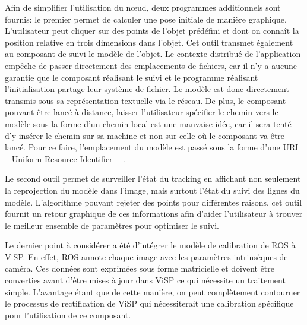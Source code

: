 Afin de simplifier l'utilisation du n\oe ud, deux programmes
additionnels sont fournis: le premier permet de calculer une pose
initiale de manière graphique. L'utilisateur peut cliquer sur des
points de l'objet prédéfini et dont on connaît la position relative en
trois dimensions dans l'objet. Cet outil transmet également au
composant de suivi le modèle de l'objet. Le contexte distribué de
l'application empêche de passer directement des emplacements de
fichiers, car il n'y a aucune garantie que le composant réalisant le
suivi et le programme réalisant l'initialisation partage leur système
de fichier. Le modèle est donc directement transmis sous sa
représentation textuelle via le réseau. De plus, le composant pouvant
être lancé à distance, laisser l'utilisateur spécifier le chemin vers
le modèle sous la forme d'un chemin local est une mauvaise idée, car
il sera tenté d'y insérer le chemin sur sa machine et non sur celle où
le composant va être lancé. Pour ce faire, l'emplacement du modèle est
passé sous la forme d'une URI -- Uniform Resource Identifier
-- \citep{rfc2396}.


Le second outil permet de surveiller l'état du tracking en affichant
non seulement la reprojection du modèle dans l'image, mais surtout
l'état du suivi des lignes du modèle. L'algorithme pouvant rejeter des
points pour différentes raisons, cet outil fournit un retour graphique
de ces informations afin d'aider l'utilisateur à trouver le meilleur
ensemble de paramètres pour optimiser le suivi.


Le dernier point à considérer a été d'intégrer le modèle de
calibration de ROS à ViSP. En effet, ROS annote chaque
image avec les paramètres intrinsèques de caméra. Ces données sont exprimées sous forme
matricielle et doivent être converties avant d'être mises à jour dans
ViSP ce qui nécessite un traitement simple. L'avantage étant que de
cette manière, on peut complètement contourner le processus de
rectification de ViSP qui nécessiterait une calibration spécifique
pour l'utilisation de ce composant.



